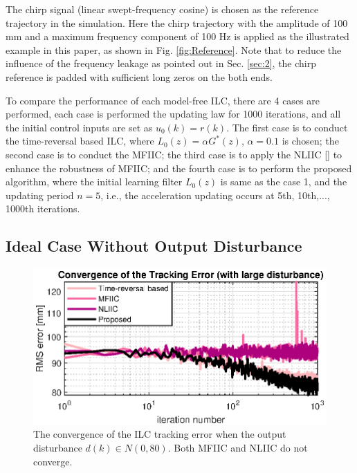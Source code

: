 \documentclass[a4paper, 12pt, twoside, openright]{mythesis}
\begin{document}
The chirp signal (linear swept-frequency cosine) is chosen as the reference trajectory in the simulation. Here the chirp trajectory with the amplitude of 100 mm and a maximum frequency component of 100 Hz is applied as the illustrated example in this paper, as shown in Fig. \ref{fig:Reference}. Note that to reduce the influence of the frequency leakage as pointed out in Sec. \ref{sec:2}, the chirp reference is padded with sufficient long zeros on the both ends.
  
To compare the performance of each model-free ILC, there are 4 cases are performed, each case is performed the updating law for 1000 iterations, and all the initial control inputs are set as $u_0(k)=r(k)$. The first case is to conduct the time-reversal based ILC, where $L_0(z)=\alpha G^{*}(z)$, $\alpha=0.1$ is chosen; the second case is to conduct the MFIIC; the third case is to apply the NLIIC [\cite{de2019data}] to enhance the robustness of MFIIC; and the fourth case is to perform the proposed algorithm, where the initial learning filter $L_0(z)$ is same as the case 1, and the updating period $n=5$, i.e., the acceleration updating occurs at 5th, 10th,..., 1000th iterations. 

\subsection{Ideal Case Without Output Disturbance} 
\label{sec: Ideal Case Without Output Disturbance}

\begin{figure}
 	\begin{center}
   	\includegraphics[width=1\linewidth] {image/ErrConvg_WithLargeDistb.eps}
 	\caption{The convergence of the ILC tracking error when the output disturbance $d(k)\in \mathit{N}(0,80)$. Both MFIIC and NLIIC do not converge.}
 	\label{fig:LargeDistb}
 	\end{center}
\end{figure}
\end{document}
